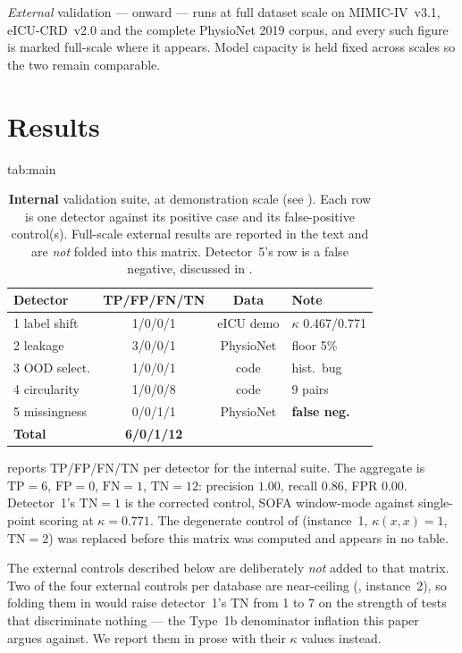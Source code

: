 \documentclass[pmlr,twocolumn,10pt]{jmlr}
\begin{document}
\emph{External} validation ---  onward --- runs at full
dataset scale on MIMIC-IV~v3.1, eICU-CRD~v2.0 and the complete PhysioNet 2019
corpus, and every such figure is marked full-scale where it appears. Model
capacity is held fixed across scales so the two remain comparable.

\section{Results}
\label{sec:results}

\begin{table}[htbp]
\floatconts
  {tab:main}
  {\caption{\textbf{Internal} validation suite, at demonstration scale (see
   ). Each row is one detector against its positive case
   and its false-positive control(s). Full-scale external results are reported
   in the text and are \emph{not} folded into this matrix. Detector~5's row is a
   false negative, discussed in .}}
  {\footnotesize\setlength{\tabcolsep}{2.5pt}%
  \begin{tabular}{@{}lccl@{}}
  \toprule
  \bfseries Detector & \bfseries TP/FP/FN/TN & \bfseries Data & \bfseries Note\\
  \midrule
  1 label shift  & 1/0/0/1  & eICU demo & $\kappa$ 0.467/0.771\\
  2 leakage      & 3/0/0/1  & PhysioNet & floor 5\%\\
  3 OOD select.  & 1/0/0/1  & code      & hist.\ bug\\
  4 circularity  & 1/0/0/8  & code      & 9 pairs\\
  5 missingness  & 0/0/1/1  & PhysioNet & \bfseries false neg.\\
  \midrule
  \bfseries Total & \bfseries 6/0/1/12 &  & \\
  \bottomrule
  \end{tabular}}
\end{table}

 reports TP/FP/FN/TN per detector for the internal suite.
The aggregate is $\mathrm{TP}=6$, $\mathrm{FP}=0$, $\mathrm{FN}=1$,
$\mathrm{TN}=12$: precision $1.00$, recall $0.86$, FPR $0.00$. Detector~1's
$\mathrm{TN}=1$ is the corrected control, SOFA window-mode against single-point
scoring at $\kappa=0.771$. The degenerate control of 
(instance~1, $\kappa(x,x)=1$, $\mathrm{TN}=2$) was replaced before this matrix
was computed and appears in no table.

The external controls described below are deliberately \emph{not} added to that
matrix. Two of the four external controls per database are near-ceiling
(, instance~2), so folding them in would raise
detector~1's TN from 1 to 7 on the strength of tests that discriminate nothing
--- the Type~1b denominator inflation this paper argues against. We report them
in prose with their $\kappa$ values instead.
\end{document}

